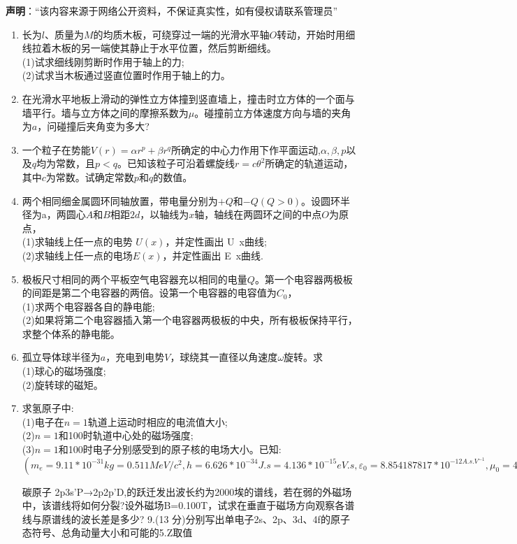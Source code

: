 
\textbf{声明}：“该内容来源于网络公开资料，不保证真实性，如有侵权请联系管理员”
\begin{enumerate}
\item 长为$l$、质量为$M$的均质木板，可绕穿过一端的光滑水平轴$O$转动，开始时用细线拉着木板的另一端使其静止于水平位置，然后剪断细线。\\
(1)试求细线刚剪断时作用于轴上的力;\\
(2)试求当木板通过竖直位置时作用于轴上的力。
\item 在光滑水平地板上滑动的弹性立方体撞到竖直墙上，撞击时立方体的一个面与墙平行。墙与立方体之间的摩擦系数为$\mu$。碰撞前立方体速度方向与墙的夹角为$a$，问碰撞后夹角变为多大?
\item 一个粒子在势能$V(r)=\alpha r^p+\beta r^q$所确定的中心力作用下作平面运动,$\alpha,\beta,p$以及$q$均为常数，且$p<q$。已知该粒子可沿着螺旋线$r=c\theta^2$所确定的轨道运动，其中$c$为常数。试确定常数$p$和$q$的数值。
\item 两个相同细金属圆环同轴放置，带电量分别为$+Q$和$-Q(Q>0)$。设圆环半径为a，两圆心$A$和$B$相距$2d$，以轴线为$x$轴，轴线在两圆环之间的中点$O$为原点，\\
(1)求轴线上任一点的电势 $U(x)$，并定性画出 U~x曲线;\\
(2)求轴线上任一点的电场$E(x)$，并定性画出 E~x曲线.
\item 极板尺寸相同的两个平板空气电容器充以相同的电量$Q$。第一个电容器两极板的间距是第二个电容器的两倍。设第一个电容器的电容值为$C_0$，\\
(1)求两个电容器各自的静电能;\\
(2)如果将第二个电容器插入第一个电容器两极板的中央，所有极板保持平行，求整个体系的静电能。
\item 孤立导体球半径为$a$，充电到电势$V$，球绕其一直径以角速度$\omega$旋转。求\\
(1)球心的磁场强度;\\
(2)旋转球的磁矩。
\item 求氢原子中:\\
(1)电子在$n=1$轨道上运动时相应的电流值大小;\\
(2)$n=1$和100时轨道中心处的磁场强度;\\
(3)$n=1$和100时电子分别感受到的原子核的电场大小。已知:$(m_e=9.11*10^{-31}kg=0.511MeV/c^2,h=6.626*10^{-34}J.s=4.136*10^{-15}eV.s,\varepsilon_0=8.854187817*10^{-12 A.s.V^{-1}},\mu_0=4\pi*10^{-7}=12.5663)$

碳原子 2p3s'P→2p2p'D,的跃迁发出波长约为2000埃的谱线，若在弱的外磁场中，该谱线将如何分裂?设外磁场B=0.100T，试求在垂直于磁场方向观察各谱线与原谱线的波长差是多少?
9.(13 分)分别写出单电子2s、2p、3d、4f的原子态符号、总角动量大小和可能的5.Z取值
\end{enumerate}